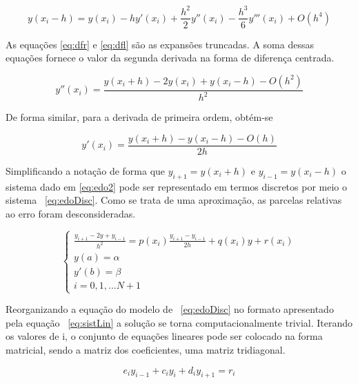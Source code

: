 \begin{equation}
    \label{eq:dfl}
    y(x_i - h) = y(x_i) - hy'(x_i) + \frac{h^{2}}{2}y''(x_i) - \frac{h^{3}}{6}y'''(x_i) + O(h^{4})
\end{equation}

As equações \ref{eq:dfr} e \ref{eq:dfl} são as expansões truncadas. A soma dessas equações fornece o valor da segunda derivada na forma de diferença centrada.

\begin{equation}
    \label{eq:difcent2}
    y''(x_i) = \frac{y(x_i + h) - 2y(x_i) +y(x_i - h) - O(h^{2})}{h^2}
\end{equation}

 De forma similar, para a derivada de primeira ordem, obtém-se

\begin{equation}
    \label{eq:difcent}
    y'(x_i) = \frac{y(x_i + h) - y(x_i - h) - O(h)}{2h}
\end{equation}

Simplificando a notação de forma que $y_{i+1} = y(x_i + h)$ e $y_{i-1} = y(x_i - h)$ o sistema dado em \ref{eq:edo2} pode ser representado em termos discretos por meio o sistema ~\ref{eq:edoDisc}. Como se trata de uma aproximação, as parcelas relativas ao erro foram desconsideradas.

\begin{equation}
	\label{eq:edoDisc}
	\begin{cases}
		  \frac{y_{i+1} - 2y +y_{i-1}}{h^2} = p(x_i) \frac{y_{i+1} - y_{i-1}}{2h} +q(x_i)y + r(x_i)\\
			y(a) = \alpha \\
			y'(b) = \beta \\
			 i = 0, 1, ... N+1
	\end{cases}
\end{equation}

Reorganizando a equação do modelo de ~\ref{eq:edoDisc} no formato apresentado pela equação ~\ref{eq:sistLin} a solução se torna computacionalmente trivial. Iterando os valores de i, o conjunto de equações lineares pode ser colocado na forma matricial, sendo a matriz dos coeficientes, uma matriz tridiagonal.

\begin{equation}
	\label{eq:sistLin}
	e_i y_{i-1} + c_i y_i + d_i y_{i +1} = r_i
\end{equation}

